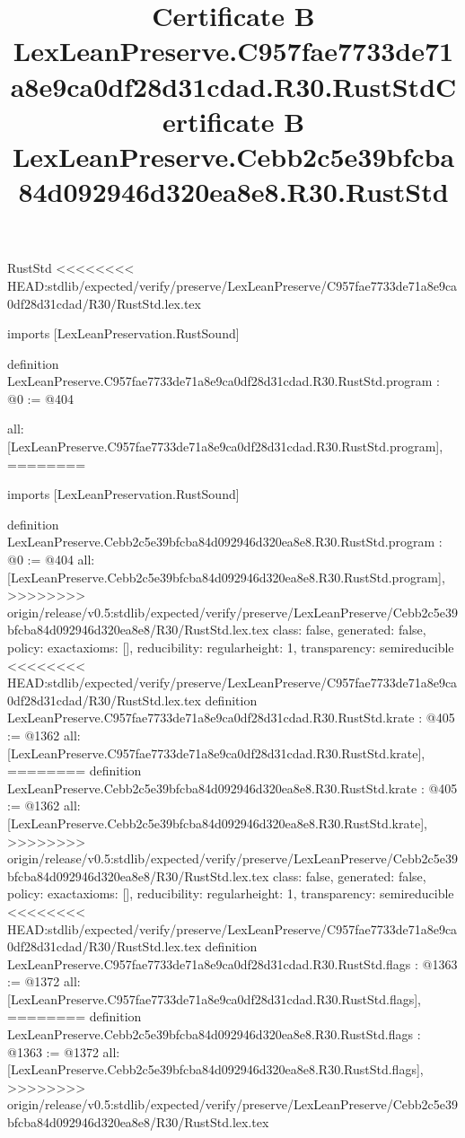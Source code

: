 \begin{lexlean}{RustStd}
<<<<<<<< HEAD:stdlib/expected/verify/preserve/LexLeanPreserve/C957fae7733de71a8e9ca0df28d31cdad/R30/RustStd.lex.tex
\title{Certificate B LexLeanPreserve.C957fae7733de71a8e9ca0df28d31cdad.R30.RustStd}
\begin{coremodule}
imports [LexLeanPreservation.RustSound]

definition LexLeanPreserve.C957fae7733de71a8e9ca0df28d31cdad.R30.RustStd.program : @0 := @404 {
  all: [LexLeanPreserve.C957fae7733de71a8e9ca0df28d31cdad.R30.RustStd.program],
========
\title{Certificate B LexLeanPreserve.Cebb2c5e39bfcba84d092946d320ea8e8.R30.RustStd}
\begin{coremodule}
imports [LexLeanPreservation.RustSound]

definition LexLeanPreserve.Cebb2c5e39bfcba84d092946d320ea8e8.R30.RustStd.program : @0 := @404 {
  all: [LexLeanPreserve.Cebb2c5e39bfcba84d092946d320ea8e8.R30.RustStd.program],
>>>>>>>> origin/release/v0.5:stdlib/expected/verify/preserve/LexLeanPreserve/Cebb2c5e39bfcba84d092946d320ea8e8/R30/RustStd.lex.tex
  class: false,
  generated: false,
  policy: exact{axioms: []},
  reducibility: regular{height: 1},
  transparency: semireducible
}
<<<<<<<< HEAD:stdlib/expected/verify/preserve/LexLeanPreserve/C957fae7733de71a8e9ca0df28d31cdad/R30/RustStd.lex.tex
definition LexLeanPreserve.C957fae7733de71a8e9ca0df28d31cdad.R30.RustStd.krate : @405 := @1362 {
  all: [LexLeanPreserve.C957fae7733de71a8e9ca0df28d31cdad.R30.RustStd.krate],
========
definition LexLeanPreserve.Cebb2c5e39bfcba84d092946d320ea8e8.R30.RustStd.krate : @405 := @1362 {
  all: [LexLeanPreserve.Cebb2c5e39bfcba84d092946d320ea8e8.R30.RustStd.krate],
>>>>>>>> origin/release/v0.5:stdlib/expected/verify/preserve/LexLeanPreserve/Cebb2c5e39bfcba84d092946d320ea8e8/R30/RustStd.lex.tex
  class: false,
  generated: false,
  policy: exact{axioms: []},
  reducibility: regular{height: 1},
  transparency: semireducible
}
<<<<<<<< HEAD:stdlib/expected/verify/preserve/LexLeanPreserve/C957fae7733de71a8e9ca0df28d31cdad/R30/RustStd.lex.tex
definition LexLeanPreserve.C957fae7733de71a8e9ca0df28d31cdad.R30.RustStd.flags : @1363 := @1372 {
  all: [LexLeanPreserve.C957fae7733de71a8e9ca0df28d31cdad.R30.RustStd.flags],
========
definition LexLeanPreserve.Cebb2c5e39bfcba84d092946d320ea8e8.R30.RustStd.flags : @1363 := @1372 {
  all: [LexLeanPreserve.Cebb2c5e39bfcba84d092946d320ea8e8.R30.RustStd.flags],
>>>>>>>> origin/release/v0.5:stdlib/expected/verify/preserve/LexLeanPreserve/Cebb2c5e39bfcba84d092946d320ea8e8/R30/RustStd.lex.tex
}}}
\end{coremodule}}
\end{coremodule}
\end{lexlean}
